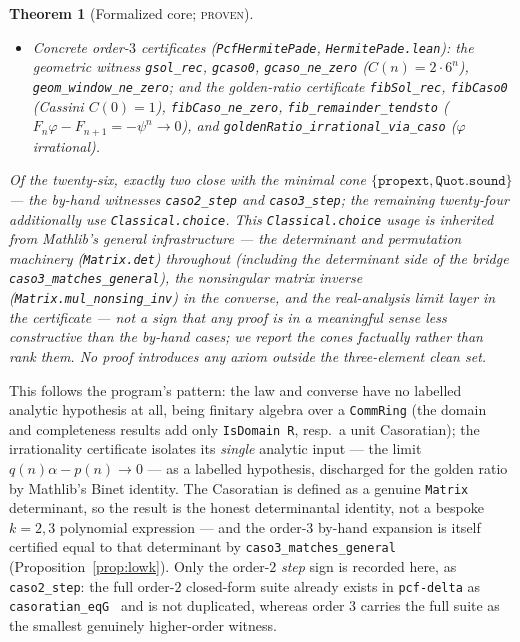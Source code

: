 \documentclass[11pt]{article}
\newtheorem{theorem}{Theorem}
\newcommand{\Caso}{C}
\begin{document}
\begin{theorem}[Formalized core; \textsc{proven}]
\begin{itemize}
\texttt{linForm\_window\_ne\_zero} (no full-window vanishing over a domain),
\texttt{linForm\_frequently\_ne\_zero} (frequent non-vanishing),
\texttt{irrational\_of\_linearForm\_frequently} (the linear-form irrationality
criterion), and the
capstone \texttt{irrational\_of\_fundamentalSet\_form} --- Section~\ref{sec:cert}.
\item \emph{Concrete order-$3$ certificates} (\texttt{PcfHermitePade},
\texttt{HermitePade.lean}): the geometric witness \texttt{gsol\_rec},
\texttt{gcaso0}, \texttt{gcaso\_ne\_zero} ($\Caso(n)=2\cdot6^n$),
\texttt{geom\_window\_ne\_zero}; and the golden-ratio certificate \texttt{fibSol\_rec},
\texttt{fibCaso0} (Cassini $\Caso(0)=1$), \texttt{fibCaso\_ne\_zero},
\texttt{fib\_remainder\_tendsto} ($F_n\varphi-F_{n+1}=-\psi^n\to0$), and
\texttt{goldenRatio\_irrational\_via\_caso} ($\varphi$ irrational).
\end{itemize}
Of the twenty-six, exactly two close with the minimal cone
$\{\texttt{propext},\texttt{Quot.sound}\}$ --- the by-hand witnesses
\texttt{caso2\_step} and \texttt{caso3\_step}; the remaining twenty-four additionally
use \texttt{Classical.choice}. This \texttt{Classical.choice} usage is inherited from
Mathlib's general infrastructure --- the determinant and permutation machinery
(\texttt{Matrix.det}) throughout (including the determinant side of the bridge
\texttt{caso3\_matches\_general}), the nonsingular matrix inverse
(\texttt{Matrix.mul\_nonsing\_inv}) in the converse, and the real-analysis limit layer
in the certificate --- not a sign that any proof is in a meaningful sense less
constructive than the by-hand cases; we report the cones factually rather than rank
them. No proof introduces any axiom outside the three-element clean set.
\end{theorem}

This follows the program's pattern: the law and converse have no labelled analytic
hypothesis at all, being finitary algebra over a \texttt{CommRing} (the domain and
completeness results add only \texttt{IsDomain\,R}, resp.\ a unit Casoratian); the
irrationality certificate isolates its \emph{single} analytic input --- the limit
$q(n)\alpha-p(n)\to0$ --- as a labelled hypothesis, discharged for the golden ratio by
Mathlib's Binet identity. The Casoratian
is defined as a genuine \texttt{Matrix} determinant, so the result is the honest
determinantal identity, not a bespoke $k=2,3$ polynomial expression --- and the order-$3$
by-hand expansion is itself certified equal to that determinant by
\texttt{caso3\_matches\_general} (Proposition~\ref{prop:lowk}). Only the
order-$2$ \emph{step} sign is recorded here, as \texttt{caso2\_step}: the full
order-$2$ closed-form suite already exists in \texttt{pcf-delta} as
\texttt{casoratian\_eqG}~\cite{pcfdelta} and is not duplicated, whereas order $3$
carries the full suite as the smallest genuinely higher-order witness.
\end{document}
